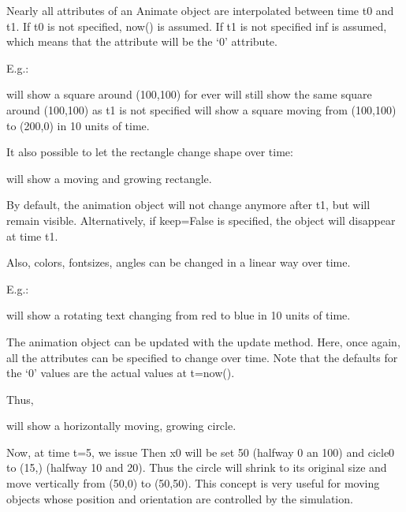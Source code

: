 \documentclass[letterpaper,10pt,english]{sphinxmanual}
\begin{document}
Nearly all attributes of an Animate object are interpolated between time t0 and t1.
If t0 is not specified, now() is assumed.
If t1 is not specified inf is assumed, which means that the attribute will be the ‘0’ attribute.

E.g.:

 will show a square around (100,100) for ever 
 will still show the same square around (100,100) as t1 is not specified 
 will show a square moving from (100,100) to (200,0) in 10 units of time. 

It also possible to let the rectangle change shape over time:

 will show a moving and growing rectangle. 

By default, the animation object will not change anymore after t1, but will remain visible. Alternatively, if
keep=False is specified, the object will disappear at time t1.

Also, colors, fontsizes, angles can be changed in a linear way over time.

E.g.:

 will show a rotating text changing from red to blue in 10 units of time.

The animation object can be updated with the update method. Here, once again, all the attributes can be specified to change over time. Note that the defaults for the ‘0’ values are the actual values at t=now().

Thus,

will show a horizontally moving, growing circle.

Now, at time t=5, we issue
Then x0 will be set 50 (halfway 0 an 100) and cicle0 to (15,) (halfway 10 and 20).
Thus the circle will shrink to its original size and move vertically from (50,0) to (50,50).
This concept is very useful for moving objects whose position and orientation are controlled by the simulation.
\end{document}
